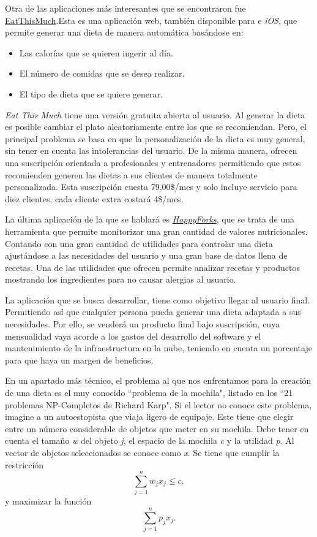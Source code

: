 Otra de las aplicaciones más interesantes que se encontraron fue \href{https://www.eatthismuch.com/}{EatThisMuch}.Esta es una aplicación web, también disponible para  e \emph{iOS}, que permite generar una dieta de manera automática basándose en:
\begin{itemize}
    \item Las calorías que se quieren ingerir al día.
    \item El número de comidas que se desea realizar.
    \item El tipo de dieta que se quiere generar.
\end{itemize}
\emph{Eat This Much} tiene una versión gratuita abierta al usuario. Al generar la dieta es posible cambiar el plato aleatoriamente entre los que se recomiendan. Pero, el principal problema se basa en que la personalización de la dieta es muy general, sin tener en cuenta las intolerancias del usuario. De la misma manera, ofrecen una suscripción orientada a profesionales y entrenadores permitiendo que estos recomienden generen las dietas a sus clientes de manera totalmente personalizada. Esta suscripción cuesta 79,00\$/mes y solo incluye servicio para diez clientes, cada cliente extra costará 4\$/mes. 

La última aplicación de la que se hablará es \href{https://happyforks.com/}{\emph{HappyForks}}, que se trata de una herramienta que permite monitorizar una gran cantidad de valores nutricionales. Contando con una gran cantidad de utilidades para controlar una dieta ajustándose a las necesidades del usuario y una gran base de datos llena de recetas. Una de las utilidades que ofrecen permite analizar recetas y productos mostrando los ingredientes para no causar alergias al usuario. 

La aplicación que se busca desarrollar, tiene como objetivo llegar al usuario final. Permitiendo así que cualquier persona pueda generar una dieta adaptada a sus necesidades. Por ello, se venderá un producto final bajo suscripción, cuya mensualidad vaya acorde a los gastos del desarrollo del software y el mantenimiento de la infraestructura en la nube, teniendo en cuenta un porcentaje para que haya un margen de beneficios.

En un apartado más técnico, el problema al que nos enfrentamos para la creación de una dieta es el muy conocido ``problema de la mochila", listado en los ``21 problemas NP-Completos de Richard Karp". Si el lector no conoce este problema, imagine a un autoestopista que viaja ligero de equipaje. Este tiene que elegir entre un número considerable de objetos que meter en su mochila. Debe tener en cuenta el tamaño \emph{w} del objeto \emph{j}, el espacio de la mochila \emph{c} y la utilidad \emph{p}. Al vector de objetos seleccionados se conoce como \emph{x}. Se tiene que cumplir la restricción
\begin{equation}
    \sum_{j=1}^{n}w_{j}x_{j} \leq c,
\end{equation}
y maximizar la función
\begin{equation}
    \sum_{j=1}^{n}p_{j}x_{j}.
\end{equation}

